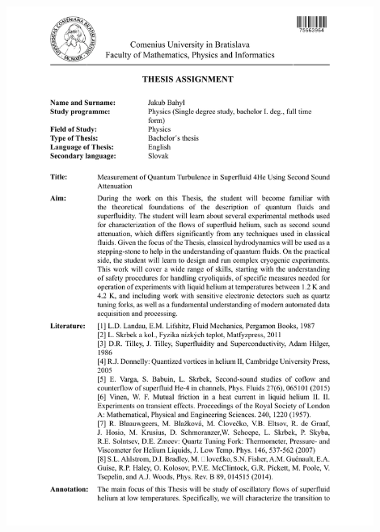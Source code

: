 \documentclass[a4paper, 12pt]{report}
\newcommand{\<}{\langle} %
\renewcommand{\>}{\rangle} %
\begin{document}
\pagestyle{empty}





\includegraphics[width=0.9\textwidth]{docs/zadanie_Bahyl_EN.pdf}
\newpage
\end{document}
